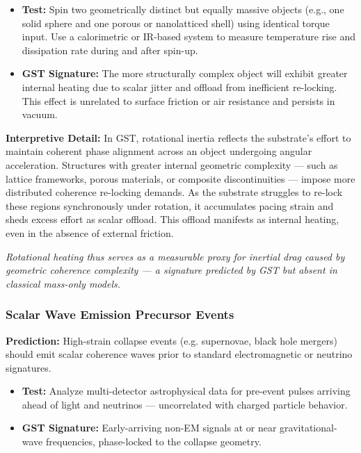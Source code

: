 \documentclass[entropy,article,submit,pdftex,moreauthors]{Definitions/mdpi}
\begin{document}
\begin{itemize}
    \item \textbf{Test:} Spin two geometrically distinct but equally massive objects (e.g., one solid sphere and one porous or nanolatticed shell) using identical torque input. Use a calorimetric or IR-based system to measure temperature rise and dissipation rate during and after spin-up.
    \item \textbf{GST Signature:} The more structurally complex object will exhibit greater internal heating due to scalar jitter and offload from inefficient re-locking. This effect is unrelated to surface friction or air resistance and persists in vacuum.
\end{itemize}

\textbf{Interpretive Detail:} In GST, rotational inertia reflects the substrate’s effort to maintain coherent phase alignment across an object undergoing angular acceleration. Structures with greater internal geometric complexity — such as lattice frameworks, porous materials, or composite discontinuities — impose more distributed coherence re-locking demands. As the substrate struggles to re-lock these regions synchronously under rotation, it accumulates pacing strain and sheds excess effort as scalar offload. This offload manifests as internal heating, even in the absence of external friction.

\textit{Rotational heating thus serves as a measurable proxy for inertial drag caused by geometric coherence complexity — a signature predicted by GST but absent in classical mass-only models.}



\subsubsection{Scalar Wave Emission Precursor Events}

\textbf{Prediction:} High-strain collapse events (e.g. supernovae, black hole mergers) should emit scalar coherence waves prior to standard electromagnetic or neutrino signatures.

\begin{itemize}
    \item \textbf{Test:} Analyze multi-detector astrophysical data for pre-event pulses arriving ahead of light and neutrinos — uncorrelated with charged particle behavior.
    \item \textbf{GST Signature:} Early-arriving non-EM signals at or near gravitational-wave frequencies, phase-locked to the collapse geometry.
\end{itemize}
\end{document}
